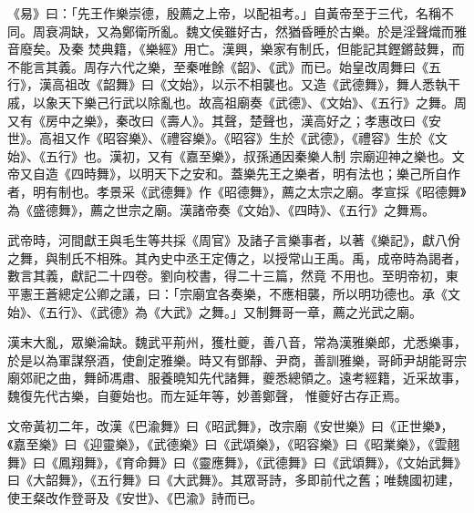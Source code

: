 
\begin{pinyinscope}

 《易》曰：「先王作樂崇德，殷薦之上帝，以配祖考。」自黃帝至于三代，名稱不同。周衰凋缺，又為鄭衛所亂。魏文侯雖好古，然猶昏睡於古樂。於是淫聲熾而雅音廢矣。及秦
 焚典籍，《樂經》用亡。漢興，樂家有制氏，但能記其鏗鏘鼓舞，而不能言其義。周存六代之樂，至秦唯餘《韶》、《武》而已。始皇改周舞曰《五行》，漢高祖改《韶舞》曰《文始》，以示不相襲也。又造《武德舞》，舞人悉執干戚，以象天下樂己行武以除亂也。故高祖廟奏《武德》、《文始》、《五行》之舞。周又有《房中之樂》，秦改曰《壽人》。其聲，楚聲也，漢高好之；孝惠改曰《安世》。高祖又作《昭容樂》、《禮容樂》。《昭容》生於《武德》，《禮容》生於《文始》、《五行》也。漢初，又有《嘉至樂》，叔孫通因秦樂人制
 宗廟迎神之樂也。文帝又自造《四時舞》，以明天下之安和。蓋樂先王之樂者，明有法也；樂己所自作者，明有制也。孝景采《武德舞》作《昭德舞》，薦之太宗之廟。孝宣採《昭德舞》為《盛德舞》，薦之世宗之廟。漢諸帝奏《文始》、《四時》、《五行》之舞焉。



 武帝時，河間獻王與毛生等共採《周官》及諸子言樂事者，以著《樂記》，獻八佾之舞，與制氏不相殊。其內史中丞王定傳之，以授常山王禹。禹，成帝時為謁者，數言其義，獻記二十四卷。劉向校書，得二十三篇，然竟
 不用也。至明帝初，東平憲王蒼總定公卿之議，曰：「宗廟宜各奏樂，不應相襲，所以明功德也。承《文始》、《五行》、《武德》為《大武》之舞。」又制舞哥一章，薦之光武之廟。



 漢末大亂，眾樂淪缺。魏武平荊州，獲杜夔，善八音，常為漢雅樂郎，尤悉樂事，於是以為軍謀祭酒，使創定雅樂。時又有鄧靜、尹商，善訓雅樂，哥師尹胡能哥宗廟郊祀之曲，舞師馮肅、服養曉知先代諸舞，夔悉總領之。遠考經籍，近采故事，魏復先代古樂，自夔始也。而左延年等，妙善鄭聲，
 惟夔好古存正焉。



 文帝黃初二年，改漢《巴渝舞》曰《昭武舞》，改宗廟《安世樂》曰《正世樂》，《嘉至樂》曰《迎靈樂》，《武德樂》曰《武頌樂》，《昭容樂》曰《昭業樂》，《雲翹舞》曰《鳳翔舞》，《育命舞》曰《靈應舞》，《武德舞》曰《武頌舞》，《文始武舞》曰《大韶舞》，《五行舞》曰《大武舞》。其眾哥詩，多即前代之舊；唯魏國初建，使王粲改作登哥及《安世》、《巴渝》詩而已。




\end{pinyinscope}
